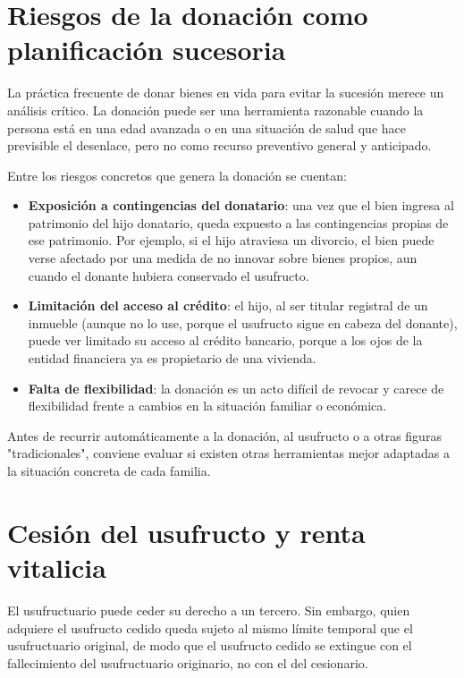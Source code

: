 \documentclass[12pt,oneside]{book}
\begin{document}
\section{Riesgos de la donación como planificación sucesoria}

La práctica frecuente de donar bienes en vida para evitar la sucesión merece un análisis crítico. La donación puede ser una herramienta razonable cuando la persona está en una edad avanzada o en una situación de salud que hace previsible el desenlace, pero no como recurso preventivo general y anticipado.

Entre los riesgos concretos que genera la donación se cuentan:

\begin{itemize}
\item \textbf{Exposición a contingencias del donatario}: una vez que el bien ingresa al patrimonio del hijo donatario, queda expuesto a las contingencias propias de ese patrimonio. Por ejemplo, si el hijo atraviesa un divorcio, el bien puede verse afectado por una medida de no innovar sobre bienes propios, aun cuando el donante hubiera conservado el usufructo.

\item \textbf{Limitación del acceso al crédito}: el hijo, al ser titular registral de un inmueble (aunque no lo use, porque el usufructo sigue en cabeza del donante), puede ver limitado su acceso al crédito bancario, porque a los ojos de la entidad financiera ya es propietario de una vivienda.

\item \textbf{Falta de flexibilidad}: la donación es un acto difícil de revocar y carece de flexibilidad frente a cambios en la situación familiar o económica.
\end{itemize}

Antes de recurrir automáticamente a la donación, al usufructo o a otras figuras "tradicionales", conviene evaluar si existen otras herramientas mejor adaptadas a la situación concreta de cada familia.

\section{Cesión del usufructo y renta vitalicia}

El usufructuario puede ceder su derecho a un tercero. Sin embargo, quien adquiere el usufructo cedido queda sujeto al mismo límite temporal que el usufructuario original, de modo que el usufructo cedido se extingue con el fallecimiento del usufructuario originario, no con el del cesionario.
\end{document}

